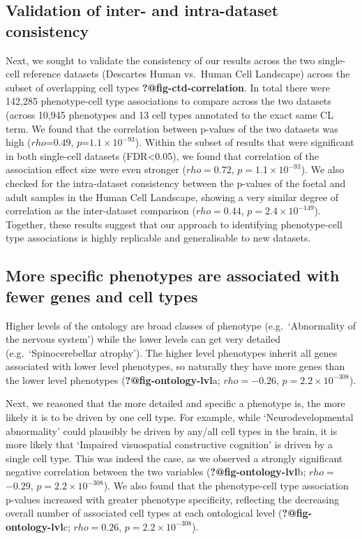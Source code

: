 \documentclass[
]{report}
\begin{document}
\subsection{Validation of inter- and intra-dataset
consistency}\label{validation-of-inter--and-intra-dataset-consistency}

Next, we sought to validate the consistency of our results across the
two single-cell reference datasets (Descartes Human vs.~Human Cell
Landscape) across the subset of overlapping cell types
\textbf{?@fig-ctd-correlation}. In total there were 142,285
phenotype-cell type associations to compare across the two datasets
(across 10,945 phenotypes and 13 cell types annotated to the exact same
CL term. We found that the correlation between p-values of the two
datasets was high (\(rho\)=\(0.49\), \(p\)=\(1.1 \times 10^{-93}\)).
Within the subset of results that were significant in both single-cell
datasets (FDR\textless0.05), we found that correlation of the
association effect size were even stronger (\(rho=\)\(0.72\),
\(p=\)\(1.1 \times 10^{-93}\)). We also checked for the intra-dataset
consistency between the p-values of the foetal and adult samples in the
Human Cell Landscape, showing a very similar degree of correlation as
the inter-dataset comparison (\(rho=\)\(0.44\),
\(p=\)\(2.4 \times 10^{-149}\)). Together, these results suggest that
our approach to identifying phenotype-cell type associations is highly
replicable and generalisable to new datasets.

\subsection{More specific phenotypes are associated with fewer genes and
cell
types}\label{more-specific-phenotypes-are-associated-with-fewer-genes-and-cell-types}

Higher levels of the ontology are broad classes of phenotype
(e.g.~`Abnormality of the nervous system') while the lower levels can
get very detailed (e.g.~`Spinocerebellar atrophy'). The higher level
phenotypes inherit all genes associated with lower level phenotypes, so
naturally they have more genes than the lower level phenotypes
(\textbf{?@fig-ontology-lvl}a; \(rho=\)\(-0.26\),
\(p=\)\(2.2 \times 10^{-308}\)).

Next, we reasoned that the more detailed and specific a phenotype is,
the more likely it is to be driven by one cell type. For example, while
`Neurodevelopmental abnormality' could plausibly be driven by any/all
cell types in the brain, it is more likely that `Impaired visuospatial
constructive cognition' is driven by a single cell type. This was indeed
the case, as we observed a strongly significant negative correlation
between the two variables (\textbf{?@fig-ontology-lvl}b;
\(rho=\)\(-0.29\), \(p=\)\(2.2 \times 10^{-308}\)). We also found that
the phenotype-cell type association p-values increased with greater
phenotype specificity, reflecting the decreasing overall number of
associated cell types at each ontological level
(\textbf{?@fig-ontology-lvl}c; \(rho=\)\(0.26\),
\(p=\)\(2.2 \times 10^{-308}\)).
\end{document}

